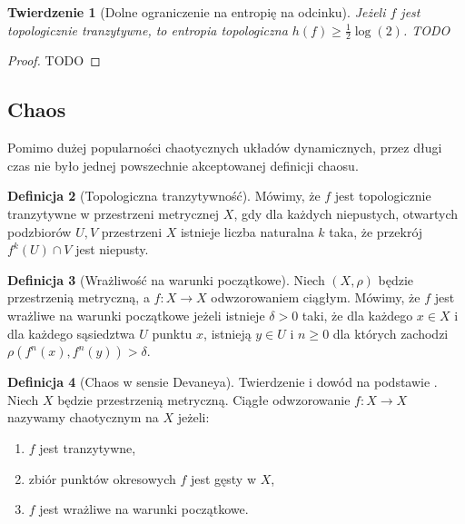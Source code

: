 \documentclass[licencjacka]{pwr_wmat_praca_dyplomowa}
\theoremstyle{plain}
\newtheorem{theorem}{Twierdzenie}
\numberwithin{theorem}{chapter}
\theoremstyle{definition}
\numberwithin{theorem}{chapter}
\newtheorem{definition}[theorem]{Definicja}
\begin{document}
 
 
 
\begin{theorem}[Dolne ograniczenie na entropię na odcinku] \label{dolne_ograniczenie_entropii_na_odcinku}
\cite{ruette2017chaos}
Jeżeli $f$ jest topologicznie tranzytywne, to entropia topologiczna $h(f) \geq \frac{1}{2} \log(2)$.
TODO
\end{theorem}

\begin{proof}
TODO
\end{proof}



\subsection{Chaos}

\cite{onDeveneyDefinitionOfChaos}

Pomimo dużej popularności chaotycznych układów dynamicznych, przez długi czas nie było jednej powszechnie akceptowanej definicji chaosu.

\begin{definition}[Topologiczna tranzytywność]
\cite{onDeveneyDefinitionOfChaos}
Mówimy, że $f$ jest topologicznie tranzytywne w przestrzeni metrycznej $X$, gdy dla każdych niepustych, otwartych podzbiorów $U, V$ przestrzeni $X$ istnieje liczba naturalna $k$ taka, że przekrój $f^k(U) \cap V$ jest niepusty.
\end{definition}

\begin{definition}[Wrażliwość na warunki początkowe]
\cite{balibrea2003topological}
Niech $(X, \rho)$ będzie przestrzenią metryczną, a $f: X \rightarrow X$ odwzorowaniem ciągłym.
Mówimy, że $f$ jest wrażliwe na warunki początkowe jeżeli  istnieje $\delta > 0$ taki, że dla każdego $x \in X$ i dla każdego sąsiedztwa $U$ punktu $x$, istnieją $y \in U$ i $n \geq 0$ dla których zachodzi $\rho(f^n(x), f^n(y)) > \delta$.
\end{definition}

\begin{definition}[Chaos w sensie Devaneya]
Twierdzenie i dowód na podstawie \cite{onDeveneyDefinitionOfChaos}.
Niech $X$ będzie przestrzenią metryczną. Ciągłe odwzorowanie $f: X \rightarrow X$ nazywamy chaotycznym na $X$ jeżeli:
\begin{enumerate}
\item $f$ jest tranzytywne,
\item zbiór punktów okresowych $f$ jest gęsty w $X$,
\item $f$ jest wrażliwe na warunki początkowe.
\end{enumerate}
\end{definition}
\end{document}
